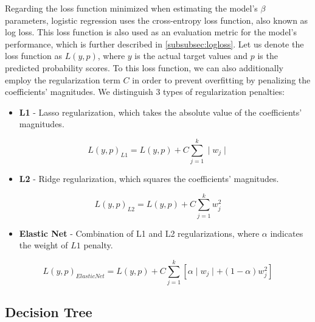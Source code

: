 Regarding the loss function minimized when estimating the model's $\beta$ parameters, logistic regression uses the cross-entropy loss function, also known as log loss.
This loss function is also used as an evaluation metric for the model's performance, which is further described in \autoref{subsubsec:logloss}.
Let us denote the loss function as $L(y, p)$, where $y$ is the actual target values and $p$ is the predicted probability scores. To this loss function, we can also additionally employ the regularization term $C$ in order to prevent overfitting \citep{pramoditha2021mitigate} by penalizing the coefficients' magnitudes.
We distinguish 3 types of regularization penalties:
\begin{itemize}\setlength\itemsep{0em}
    \item \textbf{L1} - Lasso regularization, which takes the absolute value of the coefficients' magnitudes.
\end{itemize}
\begin{equation}\label{eq:l1}
    L(y, p)_{L1}  = L(y, p) + C \sum_{j=1}^{k} \mid w_j \mid
\end{equation}
\begin{itemize}\setlength\itemsep{0em}
    \item \textbf{L2} - Ridge regularization, which squares the coefficients' magnitudes.
\end{itemize}
\begin{equation}\label{eq:l2}
    L(y, p)_{L2}  = L(y, p) + C \sum_{j=1}^{k} w_j^2
\end{equation}
\begin{itemize}\setlength\itemsep{0em}
    \item \textbf{Elastic Net} - Combination of L1 and L2 regularizations, where $\alpha$ indicates the weight of $L1$ penalty.
\end{itemize}
\begin{equation}\label{eq:elasticnet}
    L(y, p)_{ElasticNet} = L(y, p) + C \sum_{j=1}^{k} \left[ \alpha \mid w_j \mid + (1-\alpha) w_j^2 \right]
\end{equation}

\subsection{Decision Tree}
\label{subsec:dt}

